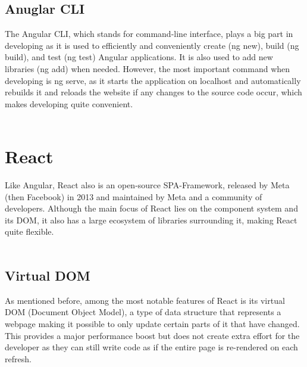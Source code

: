 \subsection{Anuglar CLI}
The Angular CLI, which stands for command-line interface, plays a big part in developing as it is used to efficiently and 
conveniently create (ng new), build (ng build), and test (ng test) Angular applications. It is also used to add new libraries 
(ng add) when needed. However, the most important command when developing is ng serve, as it starts the application on 
localhost and automatically rebuilds it and reloads the website if any changes to the source code occur, which makes 
developing quite convenient. \cite{AngularCLI}
\\
\\
\section{React}
Like Angular, React also is an open-source SPA-Framework, released by Meta (then Facebook) in 2013 and maintained by
Meta and a community of developers. Although the main focus of React lies on the component system and its DOM, it also 
has a large ecosystem of libraries surrounding it, making React quite flexible.
\\
\\
\subsection{Virtual DOM}
As mentioned before, among the most notable features of React is its virtual DOM (Document Object Model), a type of 
data structure that represents a webpage making it possible to only update certain parts of it that have changed. 
This provides a major performance boost but does not create extra effort for the developer as they can still write 
code as if the entire page is re-rendered on each refresh.
\\
\\
